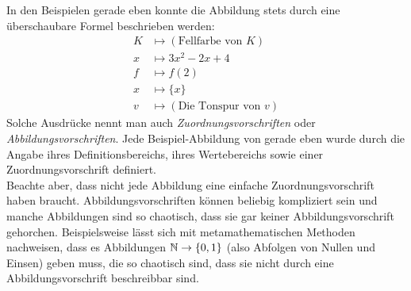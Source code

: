 \begin{bem}[Abbildungsvorschrift]
 In den Beispielen gerade eben konnte die Abbildung stets durch eine überschaubare Formel beschrieben werden:
 \begin{align*}
  K & \mapsto (\text{Fellfarbe von $K$}) \\
  x & \mapsto 3x^2-2x+4 \\
  f & \mapsto f(2) \\
  x & \mapsto \{x\} \\
  v & \mapsto (\text{Die Tonspur von $v$})
 \end{align*}
 Solche Ausdrücke nennt man auch \emph{Zuordnungsvorschriften} oder \emph{Abbildungsvorschriften}. Jede Beispiel-Abbildung von gerade eben wurde durch die Angabe ihres Definitionsbereichs, ihres Wertebereichs sowie einer Zuordnungsvorschrift definiert. \\
 Beachte aber, dass nicht jede Abbildung eine einfache Zuordnungsvorschrift haben braucht. Abbildungsvorschriften können beliebig kompliziert sein und manche Abbildungen sind so chaotisch, dass sie gar keiner Abbildungsvorschrift gehorchen. Beispielsweise lässt sich mit metamathematischen Methoden nachweisen, dass es Abbildungen ${\mathbb N} \to \{0,1\}$ (also Abfolgen von Nullen und Einsen) geben muss, die so chaotisch sind, dass sie nicht durch eine Abbildungsvorschrift beschreibbar sind.
\end{bem}



